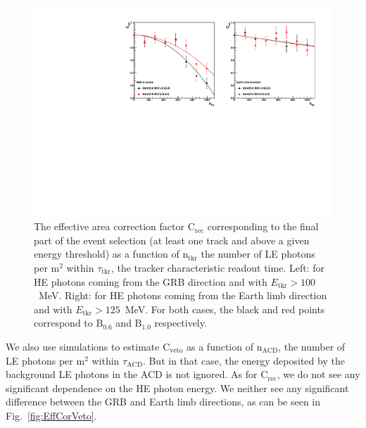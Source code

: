 \documentclass[preprint]{aastex631}
\begin{document}
\begin{figure}[t]
    \centering
    \includegraphics[width=0.9\linewidth]{paper_EfficiencyCorrection_rec.pdf}
    \caption{The effective area correction factor $\mathrm{C}_\mathrm{rec}$ corresponding to the final part of the event selection (at least one track and above a given energy threshold) as a function of $\mathrm{n}_\mathrm{tkr}$ the number of LE photons per $\mathrm{m}^2$ within $\tau_\mathrm{tkr}$, the tracker characteristic readout time. Left: for HE photons coming from the GRB direction and with $E_\mathrm{tkr}>100$~MeV. Right: for HE photons coming from the Earth limb direction and with $E_\mathrm{tkr}>125$~MeV. For both cases, the black and red points correspond to $\mathrm{B}_{0.6}$ and $\mathrm{B}_{1.0}$ respectively.}
    \label{fig:EffCorRec}
\end{figure}

We also use simulations to estimate $\mathrm{C}_\mathrm{veto}$ as a function of $\mathrm{n}_\mathrm{ACD}$, the number of LE photons per $\mathrm{m}^2$ within $\tau_\mathrm{ACD}$. But in that case, the energy deposited by the background LE photons in the ACD is not ignored. As for $\mathrm{C}_\mathrm{rec}$, we do not see any significant dependence on the HE photon energy. We neither see any significant difference between the GRB and Earth limb directions, as can be seen in Fig.~\ref{fig:EffCorVeto}.
\end{document}
